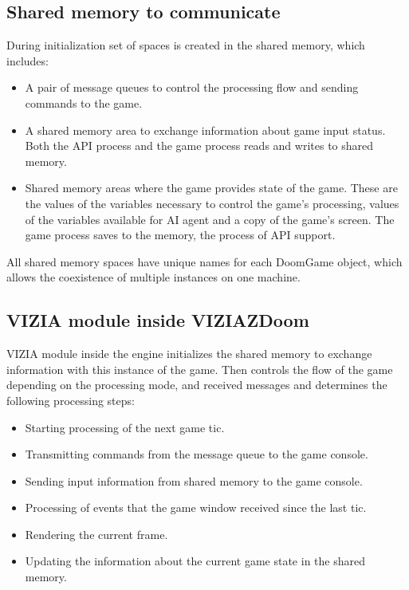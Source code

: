 \subsection{Shared memory to communicate}\label{sec:architecture_shared_memory}

During initialization set of spaces is created in the shared memory, which includes:
    \begin{itemize}
    \item A pair of message queues to control the processing flow and sending commands to the game.
    \item A shared memory area to exchange information about game input status. Both the API process and the game process reads and writes to shared memory.
    \item Shared memory areas where the game provides state of the game. These are the values of the variables necessary to control the game's processing, values of the variables available for AI agent and a copy of the game's screen. The game process saves to the memory, the process of API support.
    \end{itemize}
All shared memory spaces have unique names for each DoomGame object, which allows the coexistence of multiple instances on one machine.


\subsection{VIZIA module inside VIZIAZDoom}\label{sec:architecture_inside_viziazdoom}

VIZIA module inside the engine initializes the shared memory to exchange information with this instance of the game. Then controls the flow of the game depending on the processing mode, and received messages and determines the following processing steps:

    \begin{itemize}
    \item Starting processing of the next game tic.
    \item Transmitting commands from the message queue to the game console.
    \item Sending input information from shared memory to the game console.
    \item Processing of events that the game window received since the last tic.
    \item Rendering the current frame.
    \item Updating the information about the current game state in the shared memory.
    \end{itemize}

